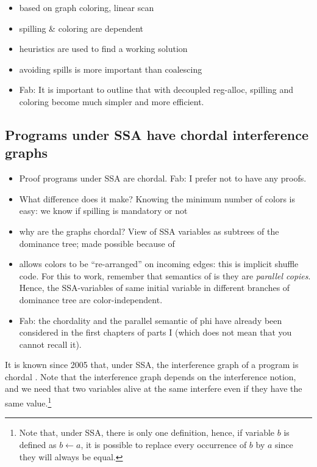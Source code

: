 {\begin{itemize}
  \item based on graph coloring, linear scan
  \item spilling \& coloring are dependent
  \item heuristics are used to find a working solution
  \item avoiding spills is more important than coalescing
  \item Fab: It is important to outline that with decoupled reg-alloc, spilling and coloring become much simpler and more efficient.
\end{itemize}


\subsection{Programs under SSA have chordal interference graphs}
{\it 
\begin{itemize}
  \item Proof programs under SSA are chordal. Fab: I prefer not to have any 
    proofs.
  \item What difference does it make? Knowing the minimum number of colors is 
    easy: we know if spilling is mandatory or not
  \item why are the graphs chordal? View of SSA variables as subtrees of the 
    dominance tree; made possible because of \phifuns
  \item \phifuns allows colors to be ``re-arranged'' on incoming edges: this 
    is implicit shuffle code. For this to work, remember that semantics of 
    \phifun is they are \emph{parallel copies}. Hence, the SSA-variables of 
    same initial variable in different branches of dominance tree are 
    color-independent.

  \item Fab: the chordality and the parallel semantic of phi have already been considered in the first chapters of parts I (which does not mean that you cannot recall it).

\end{itemize}
}

It is known since 2005 that, under SSA, the interference graph of a program is 
chordal \cite{Brisk05,Pereira05:chordal,Hack06}.  Note that the interference 
graph depends on the interference notion, and we need that two variables alive 
at the same interfere even if they have the same value.\footnote{Note that, under 
SSA, there is only one definition, hence, if variable $b$ is defined as $b\gets 
a$, it is possible to replace every occurrence of $b$ by $a$ since they will 
always be equal.
}



}

